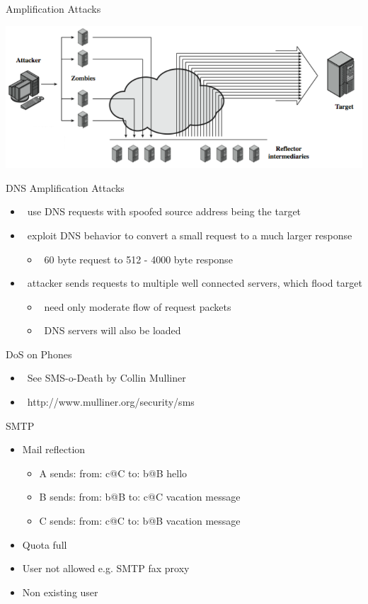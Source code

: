 \documentclass{beamer}
\begin{document}
\begin{frame}{Amplification Attacks}
  \begin{center}
  \includegraphics[width=0.8\linewidth]{amplification}
  \end{center}
\end{frame}

\begin{frame}{DNS Amplification Attacks }
  \begin{itemize}
  \item  use DNS requests with spoofed source 
    address being the target 
  \item  exploit DNS behavior to convert a small 
    request to a much larger response 
    \begin{itemize}
    \item  60 byte request to 512 - 4000 byte response 
    \end{itemize}
  \item  attacker sends requests to multiple well 
    connected servers, which flood target 
    \begin{itemize}
    \item  need only moderate flow of request packets 
    \item  DNS servers will also be loaded 
    \end{itemize}
  \end{itemize}
\end{frame}



\begin{frame}{DoS on Phones}
  \begin{itemize}
  \item  See SMS-o-Death by Collin Mulliner 
  \item  http://www.mulliner.org/security/sms
  \end{itemize}
\end{frame}


\begin{frame}{SMTP}
  \begin{itemize}
  \item Mail reflection
  \begin{itemize}
  \item A sends: from: c@C to: b@B hello
  \item B sends: from: b@B to: c@C vacation message
  \item C sends: from: c@C to: b@B vacation message
  \end{itemize}
  \item<2-> Quota full
  \item<3-> User not allowed e.g. SMTP fax proxy
  \item<4-> Non existing user
  \end{itemize}
\end{frame}
\end{document}
